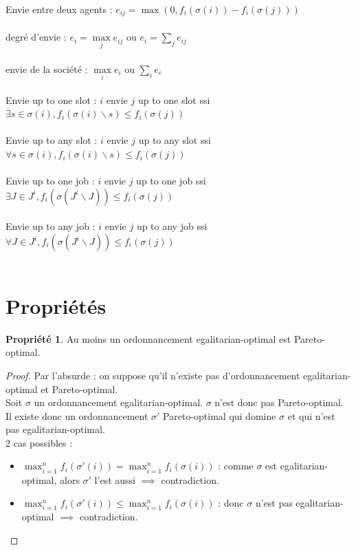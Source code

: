 \documentclass[12pt]{article}
\theoremstyle{definition}
\newtheorem{prop}{Propriété}
\begin{document}
Envie entre deux agents : $e_{ij} = \max(0, f_i(\sigma(i)) - f_i(\sigma(j)))$\\\\
degré d'envie : $e_i = \max\limits_j e_{ij}$ ou $e_i = \sum\limits_j e_{ij}$\\\\
envie de la société : $\max\limits_i e_i$ ou $\sum\limits_i e_i$\\\\
Envie up to one slot : $i$ envie $j$ up to one slot ssi $\exists s\in \sigma(i), f_i(\sigma(i)\backslash s)\leq f_i(\sigma(j))$\\\\
Envie up to any slot : $i$ envie $j$ up to any slot ssi $\forall s\in \sigma(i), f_i(\sigma(i)\backslash s)\leq f_i(\sigma(j))$\\\\
Envie up to one job : $i$ envie $j$ up to one job ssi $\exists J\in J^i, f_i(\sigma(J^i\backslash J))\leq f_i(\sigma(j))$\\\\
Envie up to any job : $i$ envie $j$ up to any job ssi $\forall J\in J^i, f_i(\sigma(J^i\backslash J))\leq f_i(\sigma(j))$\\\\

\section{Propriétés}
\begin{prop}
    Au moins un ordonnancement egalitarian-optimal est Pareto-optimal.
\end{prop}

\begin{proof}
    Par l'absurde : on suppose qu'il n'existe pas d'ordonnancement egalitarian-optimal et Pareto-optimal.\\
    Soit $\sigma$ un ordonnancement egalitarian-optimal. $\sigma$ n'est donc pas Pareto-optimal. Il existe donc un ordonnancement $\sigma'$ Pareto-optimal qui domine $\sigma$ et qui n'est pas egalitarian-optimal.\\
    2 cas possibles : 
    \begin{itemize}
        \item $\max_{i = 1}^n f_i(\sigma'(i)) = \max_{i = 1}^n f_i(\sigma(i))$ : comme $\sigma$ est egalitarian-optimal, alors $\sigma'$ l'est aussi $\implies$ contradiction.
        \item $\max_{i = 1}^n f_i(\sigma'(i)) \leq \max_{i = 1}^n f_i(\sigma(i))$ : donc $\sigma$ n'est pas egalitarian-optimal $\implies$ contradiction.
    \end{itemize}
\end{proof}
\end{document}
